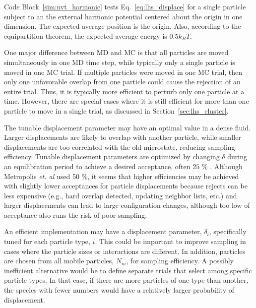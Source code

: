 \documentclass[
  9pt,
  bestpractices,
]{livecoms}
\begin{document}
\begin{figure}

\end{figure}

Code Block~\ref{sim:nvt_harmonic} tests Eq.~\ref{eq:lhs_displace} for a single particle subject to an the external harmonic potential centered about the origin in one dimension.
The expected average position is the origin.
Also, according to the equipartition theorem, the expected average energy is $0.5k_BT$.

One major difference between MD and MC is that all particles are moved simultaneously in one MD time step, while typically only a single particle is moved in one MC trial.
If multiple particles were moved in one MC trial, then only one unfavorable overlap from one particle could cause the rejection of an entire trial.
Thus, it is typically more efficient to perturb only one particle at a time.
However, there are special cases where it is still efficient for more than one particle to move in a single trial, as discussed in Section~\ref{sec:lhs_cluster}.

The tunable displacement parameter may have an optimal value in a dense fluid.
Larger displacements are likely to overlap with another particle, while smaller displacements are too correlated with the old microstate, reducing sampling efficiency.
Tunable displacement parameters are optimized by changing $\delta$ during an equilibration period to achieve a desired acceptance, often $25$ $\%$ \cite{kolafa_optimization_1987, jacucci_comparing_1984, chapman_metropolis_1985, mountain_quantative_1994, hatch_parallel_2020}.
Although Metropolis \textit{et. al} \cite{metropolis_equation_1953} used 50 \%, it seems that higher efficiencies may be achieved with slightly lower acceptances for particle displacements because rejects can be less expensive (e.g., hard overlap detected, updating neighbor lists, etc.) and larger displacements can lead to large configuration changes, although too low of acceptance also runs the risk of poor sampling.

An efficient implementation may have a displacement parameter, $\delta_i$, specifically tuned for each particle type, $i$.
This could be important to improve sampling in cases where the particle sizes or interactions are different.
In addition, particles are chosen from all mobile particles, $N_m$, for sampling efficiency.
A possibly inefficient alternative would be to define separate trials that select among specific particle types.
In that case, if there are more particles of one type than another, the species with fewer numbers would have a relatively larger probability of displacement.
\end{document}
